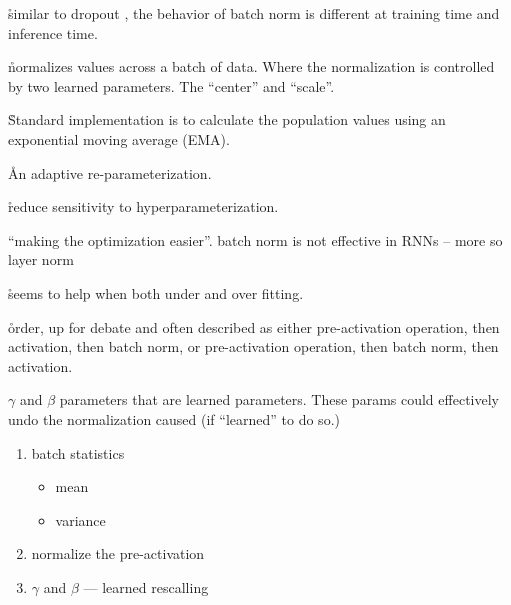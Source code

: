 


\r{similar to dropout \ALR, the behavior of batch norm is different at training time and inference time.}

\r{normalizes values across a batch of data. Where the normalization is controlled by two learned parameters. The ``center'' and ``scale''.}

\r{Standard implementation is to calculate the population values using an exponential moving average (EMA).}



\r{An adaptive re-parameterization.}

\r{reduce sensitivity to hyperparameterization.}


\r{``making the optimization easier''. batch norm is not effective in RNNs -- more so layer norm}

\r{seems to help when both under and over fitting.}

\r{order, up for debate and often described as either pre-activation operation, then activation, then batch norm, or pre-activation operation, then batch norm, then activation.}

\r{$\gamma$ and $\beta$ parameters that are learned parameters. These params could effectively undo the normalization caused (if ``learned'' to do so.)}


\begin{enumerate}[noitemsep,topsep=0pt]
	\item batch statistics
	\begin{itemize}[noitemsep,topsep=0pt]
		\item mean
		\item variance
	\end{itemize}
	\item normalize the pre-activation
	\item $\gamma$ and $\beta$ --- learned rescalling
\end{enumerate}


